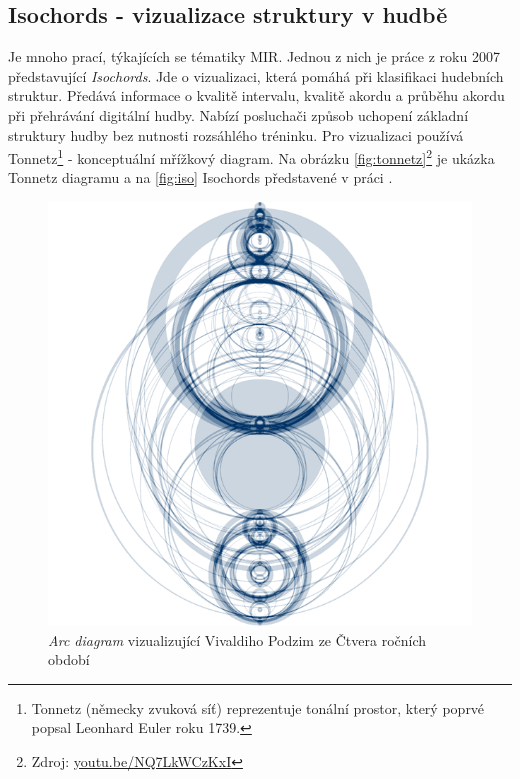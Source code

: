 \documentclass[thesis=B, czech]{FITthesis}[2019/03/06]
\begin{document}
\subsection*{Isochords - vizualizace struktury v hudbě}
Je mnoho prací, týkajících se tématiky MIR. Jednou z nich je práce \cite{isochords} z roku 2007 představující \textit{Isochords}. Jde o vizualizaci, která pomáhá při klasifikaci hudebních struktur.
Předává informace o kvalitě intervalu, kvalitě akordu a průběhu akordu při přehrávání digitální hudby. Nabízí posluchači způsob uchopení základní struktury hudby bez nutnosti rozsáhlého tréninku. Pro vizualizaci používá Tonnetz\footnote{Tonnetz (německy zvuková síť) reprezentuje tonální prostor, který poprvé popsal Leonhard Euler roku 1739.} - konceptuální mřížkový diagram. Na obrázku \ref{fig:tonnetz}\footnote{Zdroj: \url{youtu.be/NQ7LkWCzKxI}} je ukázka Tonnetz diagramu a na \ref{fig:iso} Isochords představené v práci \cite{isochords}.

\pagebreak

\begin{figure}[t]
  \centering
  \captionsetup{justification=centering}
  \includegraphics[width=360pt]{images/vivaldi.png}
  \caption[Arc diagram.]{\textit{Arc diagram} vizualizující Vivaldiho Podzim ze Čtvera ročních období}
  \label{fig:vivaldi}
\end{figure}
\end{document}
